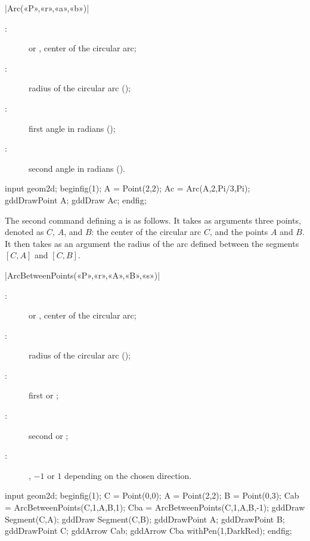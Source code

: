 \documentclass[a4paper,english]{article}
\begin{document}
\begin{colourband}
\macro|Arc(«P»,«r»,«a»,«b»)|
\begin{description}
  \item[:]  or , center of the circular arc;
  \item[:] radius of the circular arc ();
  \item[:] first angle in radians ();
  \item[:] second angle in radians ().
\end{description}
\end{colourband}


\begin{ExempleMP}
input geom2d;
beginfig(1);
A = Point(2,2);
Ac = Arc(A,2,Pi/3,Pi);
gddDrawPoint A;
gddDraw Ac;
endfig;
\end{ExempleMP}

The second command defining a  is as follows. It takes as arguments three points, denoted as $C$, $A$, and $B$: the center of the circular arc $C$, and the points $A$ and $B$. It then takes as an argument the radius of the arc defined between the segments $[C,A]$ and $[C,B]$.
\begin{colourband}
\macro|ArcBetweenPoints(«P»,«r»,«A»,«B»,«s»)|
\begin{description}
  \item[:]  or , center of the circular arc;
  \item[:] radius of the circular arc ();
  \item[:] first  or ;
  \item[:] second  or ;
  \item[:] , $-1$ or $1$ depending on the chosen direction.
\end{description}
\end{colourband}

\begin{ExempleMP}
input geom2d;
beginfig(1);
C = Point(0,0);
A = Point(2,2);
B = Point(0,3);
Cab = ArcBetweenPoints(C,1,A,B,1);
Cba = ArcBetweenPoints(C,1,A,B,-1);
gddDraw Segment(C,A);
gddDraw Segment(C,B);
gddDrawPoint A; gddDrawPoint B; gddDrawPoint C;
gddArrow Cab;
gddArrow Cba withPen(1,DarkRed);
endfig;
\end{ExempleMP}
\end{document}
